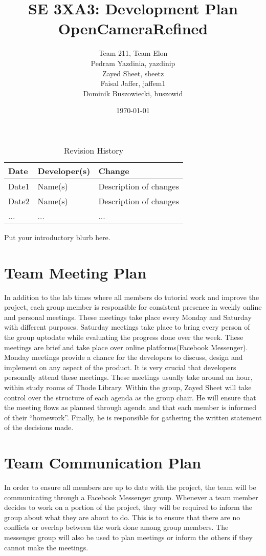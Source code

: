 \documentclass{article}
\title{SE 3XA3: Development Plan\\OpenCameraRefined}
\author{Team 211, Team Elon
		\\ Pedram Yazdinia, yazdinip
		\\ Zayed Sheet, sheetz
		\\ Faisal Jaffer, jaffem1
		\\ Dominik Buszowiecki, buszowid 
}
\date{\today}
\begin{document}
\begin{table}[hp]
\caption{Revision History} \label{TblRevisionHistory}
\begin{tabularx}{\textwidth}{llX}
\toprule
\textbf{Date} & \textbf{Developer(s)} & \textbf{Change}\\
\midrule
Date1 & Name(s) & Description of changes\\
Date2 & Name(s) & Description of changes\\
... & ... & ...\\
\bottomrule
\end{tabularx}
\end{table}

\newpage

\maketitle

Put your introductory blurb here.

\section{Team Meeting Plan}

In addition to the lab times where all members do tutorial work and improve the project, each group member is responsible for consistent presence in weekly online and personal meetings. These meetings take place every Monday and Saturday with different purposes. Saturday meetings take place to bring every person of the group uptodate while evaluating the progress done over the week. These meetings are brief and take place over online platforms(Facebook Messenger). Monday meetings provide a chance for the developers to discuss, design and implement on any aspect of the product. It is very crucial that developers personally attend these meetings. These meetings usually take around an hour, within study rooms of Thode Library. Within the group, Zayed Sheet will take control over the structure of each agenda as the group chair. He will ensure that the meeting flows as planned through agenda and that each member is informed of their “homework”. Finally, he is responsible for gathering the written statement of the decisions made. 

\section{Team Communication Plan}

In order to ensure all members are up to date with the project, the team will be communicating through a Facebook Messenger group. Whenever a team member decides to work on a portion of the project, they will be required to inform the group about what they are about to do. This is to ensure that there are no conflicts or overlap between the work done among group members. The messenger group will also be used to plan meetings or inform the others if they cannot make the meetings.
\end{document}
